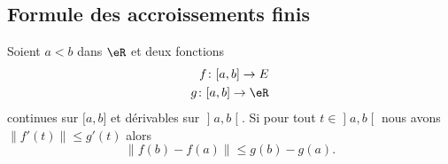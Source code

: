 \subsection{Formule des accroissements finis}


\begin{proposition} \label{PropDQLhSoy}
    Soient \( a<b\) dans \( \eR\) et deux fonctions
    \begin{subequations}
        \begin{align}
            f\colon \mathopen[ a , b \mathclose]\to E\\
            g\colon \mathopen[ a , b \mathclose]\to \eR
        \end{align}
    \end{subequations}
    continues sur \( \mathopen[ a , b \mathclose]\) et dérivables sur \( \mathopen] a , b \mathclose[\). Si pour tout \( t\in\mathopen] a , b \mathclose[\) nous avons \( \| f'(t) \|\leq g'(t)\) alors
        \begin{equation}
            \| f(b)-f(a) \|\leq g(b)-g(a).
        \end{equation}
\end{proposition}

